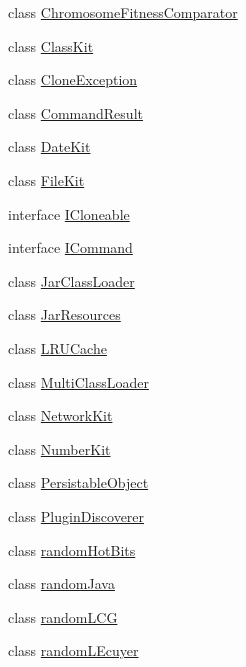 \begin{DoxyCompactItemize}
\item 
class \hyperlink{classorg_1_1jgap_1_1util_1_1_chromosome_fitness_comparator}{Chromosome\-Fitness\-Comparator}
\item 
class \hyperlink{classorg_1_1jgap_1_1util_1_1_class_kit}{Class\-Kit}
\item 
class \hyperlink{classorg_1_1jgap_1_1util_1_1_clone_exception}{Clone\-Exception}
\item 
class \hyperlink{classorg_1_1jgap_1_1util_1_1_command_result}{Command\-Result}
\item 
class \hyperlink{classorg_1_1jgap_1_1util_1_1_date_kit}{Date\-Kit}
\item 
class \hyperlink{classorg_1_1jgap_1_1util_1_1_file_kit}{File\-Kit}
\item 
interface \hyperlink{interfaceorg_1_1jgap_1_1util_1_1_i_cloneable}{I\-Cloneable}
\item 
interface \hyperlink{interfaceorg_1_1jgap_1_1util_1_1_i_command}{I\-Command}
\item 
class \hyperlink{classorg_1_1jgap_1_1util_1_1_jar_class_loader}{Jar\-Class\-Loader}
\item 
class \hyperlink{classorg_1_1jgap_1_1util_1_1_jar_resources}{Jar\-Resources}
\item 
class \hyperlink{classorg_1_1jgap_1_1util_1_1_l_r_u_cache}{L\-R\-U\-Cache}
\item 
class \hyperlink{classorg_1_1jgap_1_1util_1_1_multi_class_loader}{Multi\-Class\-Loader}
\item 
class \hyperlink{classorg_1_1jgap_1_1util_1_1_network_kit}{Network\-Kit}
\item 
class \hyperlink{classorg_1_1jgap_1_1util_1_1_number_kit}{Number\-Kit}
\item 
class \hyperlink{classorg_1_1jgap_1_1util_1_1_persistable_object}{Persistable\-Object}
\item 
class \hyperlink{classorg_1_1jgap_1_1util_1_1_plugin_discoverer}{Plugin\-Discoverer}
\item 
class \hyperlink{classorg_1_1jgap_1_1util_1_1random_hot_bits}{random\-Hot\-Bits}
\item 
class \hyperlink{classorg_1_1jgap_1_1util_1_1random_java}{random\-Java}
\item 
class \hyperlink{classorg_1_1jgap_1_1util_1_1random_l_c_g}{random\-L\-C\-G}
\item 
class \hyperlink{classorg_1_1jgap_1_1util_1_1random_l_ecuyer}{random\-L\-Ecuyer}
\item 

\end{DoxyCompactItemize}
